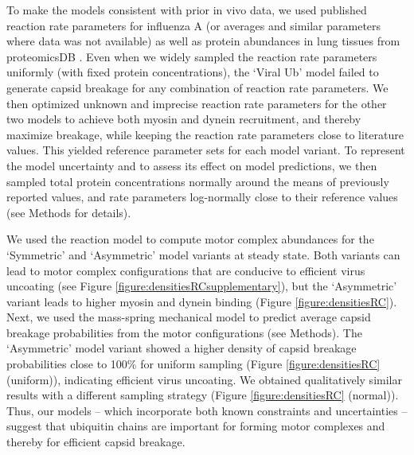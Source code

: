 To make the models consistent with prior in vivo data, we used published reaction rate parameters for influenza A (or averages and similar parameters where data was not available) as well as protein abundances in lung tissues from proteomicsDB \cite{schmidt2018proteomicsdb}. Even when we widely sampled the reaction rate parameters uniformly (with fixed protein concentrations), the ‘Viral Ub’ model failed to generate capsid breakage for any combination of reaction rate parameters. We then optimized unknown and imprecise reaction rate parameters for the other two models to achieve both myosin and dynein recruitment, and thereby maximize breakage, while keeping the reaction rate parameters close to literature values. This yielded reference parameter sets for each model variant. To represent the model uncertainty and to assess its effect on model predictions, we then sampled total protein concentrations normally around the means of previously reported values, and rate parameters log-normally close to their reference values (see Methods for details).

We used the reaction model to compute motor complex abundances for the ‘Symmetric’ and ‘Asymmetric’ model variants at steady state. Both variants can lead to motor complex configurations that are conducive to efficient virus uncoating (see Figure \ref{figure:densitiesRCsupplementary}), but the ‘Asymmetric’ variant leads to higher myosin and dynein binding (Figure \ref{figure:densitiesRC}). Next, we used the mass-spring mechanical model to predict average capsid breakage probabilities from the motor configurations (see Methods). The ‘Asymmetric’ model variant showed a higher density of capsid breakage probabilities close to 100\% for uniform sampling (Figure \ref{figure:densitiesRC} (uniform)), indicating efficient virus uncoating. We obtained qualitatively similar results with a different sampling strategy (Figure \ref{figure:densitiesRC} (normal)). Thus, our models – which incorporate both known constraints and uncertainties – suggest that ubiquitin chains are important for forming motor complexes and thereby for efficient capsid breakage.

